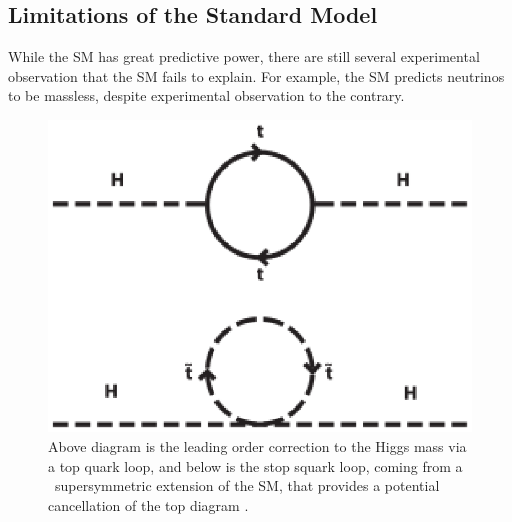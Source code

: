 
\subsection{Limitations of the Standard Model}
\label{sec:hierarchy}

While the SM has great predictive power, there are still several experimental observation that the SM fails to explain. For example, the SM predicts neutrinos to be massless, despite experimental observation to the contrary.   

\begin{figure}[!htbp]
\centering
   \includegraphics[width=0.5\linewidth]{figures/theory/hierarchyDiagram.eps}
\caption{Above diagram is the leading order correction to the Higgs mass via a top quark loop, and below is the stop squark loop, coming from a \
supersymmetric extension of the SM, that provides a potential cancellation of the top diagram \cite{}.}
\label{fig:hierarchyDiagram}
\end{figure}


